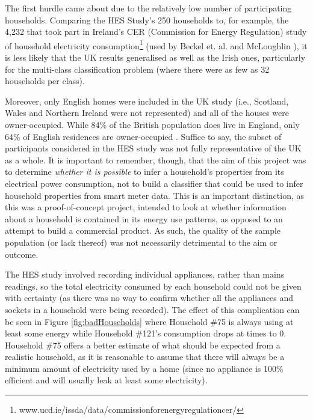 The first hurdle came about due to the relatively low number of participating households.  Comparing the HES Study's 250 households to, for example, the 4,232 that took part in Ireland's CER (Commission for Energy Regulation) study of household electricity consumption\footnote{www.ucd.ie/issda/data/commissionforenergyregulationcer/} (used by  Beckel et. al. and McLoughlin \cite{Beckel_1,Beckel_2,Beckel_3,McLoughlin}), it is less likely that the UK results generalised as well as the Irish ones, particularly for the multi-class classification problem (where there were as few as 32 households per class). 

Moreover, only English homes were included in the UK study (i.e., Scotland, Wales and Northern Ireland were not represented) and all of the houses were owner-occupied.  While 84\% of the British population does live in England, only 64\% of English residences are owner-occupied \cite{ONS}. Suffice to say, the subset of participants considered in the HES study was not fully representative of the UK as a whole. It is important to remember, though, that the aim of this project was to determine \textit{whether it is possible} to infer a household's properties from its electrical power consumption, not to build a classifier that could be used to infer household properties from smart meter data. This is an important distinction, as this was a proof-of-concept project, intended to look at whether information about a household is contained in its energy use patterns, as opposed to an attempt to build a commercial product.  As such, the quality of the sample population (or lack thereof) was not necessarily detrimental to the aim or outcome.

The HES study involved recording individual appliances, rather than mains readings, so the total electricity consumed by each household could not be given with certainty (as there was no way to confirm whether all the appliances and sockets in a household were being recorded). The effect of this complication can be seen in Figure \ref{fig:badHouseholds} where Household \#75 is always using at least some energy while Household \#121's consumption drops at times to 0. Household \#75 offers a better estimate of what should be expected from a realistic household, as it is reasonable to assume that there will always be a minimum amount of electricity used by a home (since no appliance is 100\% efficient and will usually leak at least some electricity).  

